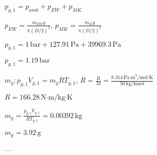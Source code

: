 \( p_{g,1} = p_{amb} + p_{EW} + p_{MK} \)  

\( p_{EW} = \frac{m_{EW} g}{\pi (D/2)^2} \), \( p_{MK} = \frac{m_{K} g}{\pi (D/2)^2} \)  

\( p_{g,1} = 1 \, \text{bar} + 127.91 \, \text{Pa} + 39969.3 \, \text{Pa} \)  

\( p_{g,1} = 1.19 \, \text{bar} \)  

\( m_{g} : p_{g,1} V_{g,1} = m_{g} R T_{g,1} \), \( R = \frac{R}{M} = \frac{8.314 \, \text{Pa·m}^3/\text{mol·K}}{50 \, \text{kg/kmol}} \)  

\( R = 166.28 \, \text{N·m/kg·K} \)  

\( m_{g} = \frac{p_{g,1} V_{g,1}}{R T_{g,1}} = 0.00392 \, \text{kg} \)  

\( m_{g} = 3.92 \, \text{g} \)  

---